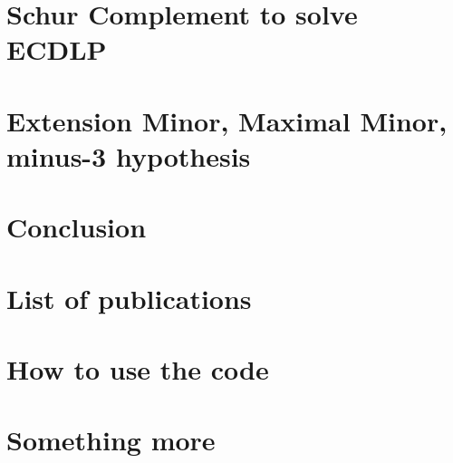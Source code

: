 \documentclass[12pt,twoside]{report}
\begin{document}
\chapter{Schur Complement to solve ECDLP }


\chapter{Extension Minor, Maximal Minor, minus-3 hypothesis  }


\chapter{Conclusion }


\chapter*{List of publications}

\appendix
\chapter{How to use the code}


\chapter{Something more}

\end{document}
